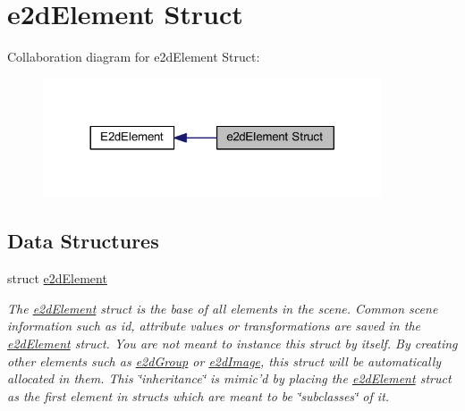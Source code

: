 \hypertarget{group__e2d_element_struct}{\section{e2d\-Element Struct}
\label{group__e2d_element_struct}
}
Collaboration diagram for e2d\-Element Struct\-:\nopagebreak
\begin{figure}[H]
\begin{center}
\leavevmode
\includegraphics[width=284pt]{group__e2d_element_struct}
\end{center}
\end{figure}
\subsection*{Data Structures}
\begin{DoxyCompactItemize}
\item 
struct \hyperlink{structe2d_element}{e2d\-Element}
\begin{DoxyCompactList}\small\item\em The \hyperlink{structe2d_element}{e2d\-Element} struct is the base of all elements in the scene. Common scene information such as id, attribute values or transformations are saved in the \hyperlink{structe2d_element}{e2d\-Element} struct. You are not meant to instance this struct by itself. By creating other elements such as \hyperlink{structe2d_group}{e2d\-Group} or \hyperlink{structe2d_image}{e2d\-Image}, this struct will be automatically allocated in them. This \char`\"{}inheritance\char`\"{} is mimic'd by placing the \hyperlink{structe2d_element}{e2d\-Element} struct as the first element in structs which are meant to be \char`\"{}subclasses\char`\"{} of it. \end{DoxyCompactList}\end{DoxyCompactItemize}

